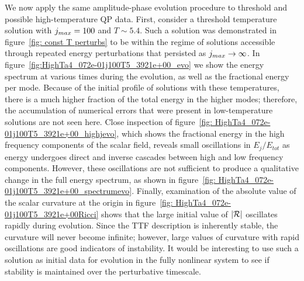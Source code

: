 \documentclass[../PhD.tex]{subfiles}
\begin{document}
We now apply the same amplitude-phase evolution procedure to threshold and possible high-temperature QP data. First, consider a threshold temperature solution with $j_{max} = 100$ and $T \sim 5.4$. Such a solution was demonstrated in figure~\ref{fig: const T perturbs} to be within the regime of solutions accessible through repeated energy perturbations that persisted as $j_{max} \to \infty$. In figure~\ref{fig:HighTa4_072e-01j100T5_3921e+00_evo} we show the energy spectrum at various times during the evolution, as well as the fractional energy per mode. Because of the initial profile of solutions with these temperatures, there is a much higher fraction of the total energy in the higher modes; therefore, the accumulation of numerical errors that were present in low-temperature solutions are not seen here. Close inspection of figure~\ref{fig: HighTa4_072e-01j100T5_3921e+00_highjevo}, which shows the fractional energy in the high frequency components of the scalar field, reveals small oscillations in $E_j/E_{tot}$ as energy undergoes direct and inverse cascades between high and low frequency components. However, these oscillations are not sufficient to produce a qualitative change in the full energy spectrum, as shown in figure~\ref{fig: HighTa4_072e-01j100T5_3921e+00_spectrumevo}. Finally, examination of the absolute value of the scalar curvature at the origin in figure~\ref{fig: HighTa4_072e-01j100T5_3921e+00Ricci} shows that the large initial value of $| \mathcal R |$ oscillates rapidly during evolution. Since the TTF description is inherently stable, the curvature will never become infinite; however, large values of curvature with rapid oscillations are good indicators of instability. It would be interesting to use such a solution as initial data for evolution in the fully nonlinear system to see if stability is maintained over the perturbative timescale. 
\end{document}
